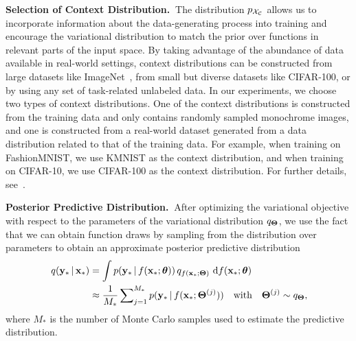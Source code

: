 \textbf{Selection of Context Distribution.}$~$
The distribution $p_{\mathcal{X}_{\mathcal{C}}}$ allows us to incorporate information about the data-generating process into training and encourage the variational distribution to match the prior over functions in relevant parts of the input space.
By taking advantage of the abundance of data available in real-world settings, context distributions can be constructed from large datasets like ImageNet~\citep{alexnet}, from small but diverse datasets like CIFAR-100, or by using any set of task-related unlabeled data.
In our experiments, we choose two types of context distributions.
One of the context distributions is constructed from the training data and only contains randomly sampled monochrome images, and one is constructed from a real-world dataset generated from a data distribution related to that of the training data.
For example, when training on FashionMNIST, we use KMNIST as the context distribution, and when training on CIFAR-10, we use CIFAR-100 as the context distribution.
For further details, see~.
%
%

\textbf{Posterior Predictive Distribution.}$~$
After optimizing the variational objective with respect to the parameters of the variational distribution $q_{\boldsymbol{\Theta}}$, we use the fact that we can obtain function draws by sampling from the distribution over parameters to obtain an approximate posterior predictive distribution
\begin{align}
%
\begin{split}
    \hspace*{-3pt}q(\by_{\ast} \vbar \bx_{\ast})
    &
    =
    \int p(\by_{\ast} \vbar f(\bx_{\ast} ; \btheta)) \, q_{f(\bx_{\ast} ; \bTheta)} \, \dee f(\bx_{\ast} ; \btheta)
    \\
    &
    \approx
    \frac{1}{M_{\ast}} \sum\nolimits_{j=1}^{M_{\ast}} p(\by_{\ast} \vbar f(\bx_{\ast} ; \bTheta^{(j)}))
    \quad
    \text{with}
    \quad
    \bTheta^{(j)} \sim q_{\bTheta} ,\hspace*{-5pt}
\end{split}
\end{align}%
where $M_{\ast}$ is the number of Monte Carlo samples used to estimate the predictive distribution.

%
%
%
%



%

%
%
%
%
%
%
%
%
%
%
%
%
%





%
%
%

%
%
%
%
%
%
%
%
%
%
%
%
%

%
%
%
%
%
%
%
%
%
%
%
%
%
%
%

%
%
%
%
%



%
